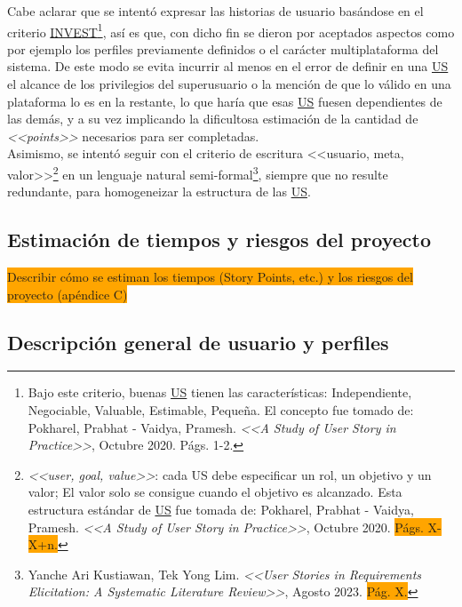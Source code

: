 \documentclass[a4paper, 12pt,twoside]{report}  %
\numberwithin{equation}{subsection} %
\begin{document}
Cabe aclarar que se intentó expresar las historias de usuario basándose en el criterio \hyperlink{INVEST}{INVEST}\footnote{Bajo este criterio, buenas \hyperlink{US}{US} tienen las características: Independiente, Negociable, Valuable, Estimable, Pequeña. El concepto fue tomado de: Pokharel, Prabhat - Vaidya, Pramesh. \textit{<<A Study of User Story in Practice>>}, Octubre 2020. Págs. 1-2.}, así es que, con dicho fin se dieron por aceptados aspectos como por ejemplo los perfiles previamente definidos o el carácter multiplataforma del sistema. De este modo se evita incurrir al menos en el error de definir en una \hyperlink{US}{US} el alcance de los privilegios del superusuario o la mención de que lo válido en una plataforma lo es en la restante, lo que haría que esas \hyperlink{US}{US} fuesen dependientes de las demás, y a su vez implicando la dificultosa estimación de la cantidad de \textit{<<points>>} necesarios para ser completadas.\\
\indent Asimismo, se intentó seguir con el criterio de escritura <<usuario, meta, valor>>\footnote{\textit{<<user, goal, value>>}: cada US debe especificar un rol, un objetivo y un valor; El valor solo se consigue cuando el objetivo es alcanzado. Esta estructura estándar de \hyperlink{US}{US} fue tomada de: Pokharel, Prabhat - Vaidya, Pramesh. \textit{<<A Study of User Story in Practice>>}, Octubre 2020. \colorbox{orange}{Págs. X-X+n.}} en un lenguaje natural semi-formal\footnote{Yanche Ari Kustiawan, Tek Yong Lim. \textit{<<User Stories in Requirements Elicitation: A Systematic Literature Review>>}, Agosto 2023. \colorbox{orange}{Pág. X.}}, siempre que no resulte redundante, para homogeneizar la estructura de las \hyperlink{US}{US}.


\subsection{Estimación de tiempos y riesgos del proyecto}
\indent\colorbox{orange}{Describir cómo se estiman los tiempos (Story Points, etc.) y los riesgos del proyecto (apéndice C)}

\subsection{Descripción general de usuario y perfiles}
\end{document}
